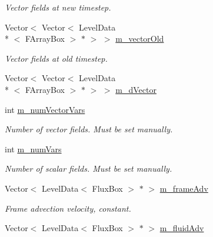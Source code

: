 \begin{DoxyCompactItemize}
\begin{DoxyCompactList}\small\item\em Vector fields at new timestep. \end{DoxyCompactList}\item 
\hypertarget{classamr_mushy_layer_a85e519a0c824adb807a95473fe57c771}{Vector$<$ Vector$<$ Level\-Data\\*
$<$ F\-Array\-Box $>$ $\ast$ $>$ $>$ \hyperlink{classamr_mushy_layer_a85e519a0c824adb807a95473fe57c771}{m\-\_\-vector\-Old}}\label{classamr_mushy_layer_a85e519a0c824adb807a95473fe57c771}

\begin{DoxyCompactList}\small\item\em Vector fields at old timestep. \end{DoxyCompactList}\item 
Vector$<$ Vector$<$ Level\-Data\\*
$<$ F\-Array\-Box $>$ $\ast$ $>$ $>$ \hyperlink{classamr_mushy_layer_a968557aafa369bfa973d63e07557a551}{m\-\_\-d\-Vector}
\item 
\hypertarget{classamr_mushy_layer_a4e7713bc5aee77742f3f64cc518f33ca}{int \hyperlink{classamr_mushy_layer_a4e7713bc5aee77742f3f64cc518f33ca}{m\-\_\-num\-Vector\-Vars}}\label{classamr_mushy_layer_a4e7713bc5aee77742f3f64cc518f33ca}

\begin{DoxyCompactList}\small\item\em Number of vector fields. Must be set manually. \end{DoxyCompactList}\item 
\hypertarget{classamr_mushy_layer_a2a0580554da0af6fd138876f588bee91}{int \hyperlink{classamr_mushy_layer_a2a0580554da0af6fd138876f588bee91}{m\-\_\-num\-Vars}}\label{classamr_mushy_layer_a2a0580554da0af6fd138876f588bee91}

\begin{DoxyCompactList}\small\item\em Number of scalar fields. Must be set manually. \end{DoxyCompactList}\item 
\hypertarget{classamr_mushy_layer_a3cf1e849c89b35ac9cacb2fb31f3cd2d}{Vector$<$ Level\-Data$<$ Flux\-Box $>$ $\ast$ $>$ \hyperlink{classamr_mushy_layer_a3cf1e849c89b35ac9cacb2fb31f3cd2d}{m\-\_\-frame\-Adv}}\label{classamr_mushy_layer_a3cf1e849c89b35ac9cacb2fb31f3cd2d}

\begin{DoxyCompactList}\small\item\em Frame advection velocity, constant. \end{DoxyCompactList}\item 
\hypertarget{classamr_mushy_layer_a7a524a754780e9f087d9d8494c7b4e70}{Vector$<$ Level\-Data$<$ Flux\-Box $>$ $\ast$ $>$ \hyperlink{classamr_mushy_layer_a7a524a754780e9f087d9d8494c7b4e70}{m\-\_\-fluid\-Adv}}\label{classamr_mushy_layer_a7a524a754780e9f087d9d8494c7b4e70}


\end{DoxyCompactItemize}
